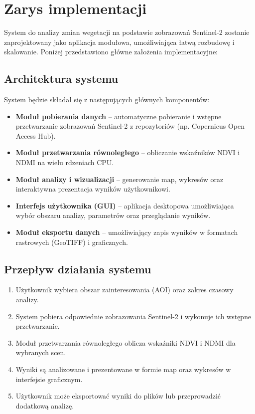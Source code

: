 \documentclass[12pt,a4paper]{article}
\begin{document}
\section{Zarys implementacji}
\label{sec:implementation}

System do analizy zmian wegetacji na podstawie zobrazowań Sentinel-2 zostanie zaprojektowany jako aplikacja modułowa, umożliwiająca łatwą rozbudowę i skalowanie. Poniżej przedstawiono główne założenia implementacyjne:

\subsection{Architektura systemu}
System będzie składał się z następujących głównych komponentów:
\begin{itemize}[leftmargin=*]
    \item \textbf{Moduł pobierania danych} -- automatyczne pobieranie i wstępne przetwarzanie zobrazowań Sentinel-2 z repozytoriów (np. Copernicus Open Access Hub).
    \item \textbf{Moduł przetwarzania równoległego} -- obliczanie wskaźników NDVI i NDMI na wielu rdzeniach CPU.
    \item \textbf{Moduł analizy i wizualizacji} -- generowanie map, wykresów oraz interaktywna prezentacja wyników użytkownikowi.
    \item \textbf{Interfejs użytkownika (GUI)} -- aplikacja desktopowa umożliwiająca wybór obszaru analizy, parametrów oraz przeglądanie wyników.
    \item \textbf{Moduł eksportu danych} -- umożliwiający zapis wyników w formatach rastrowych (GeoTIFF) i graficznych.
\end{itemize}

\subsection{Przepływ działania systemu}
\begin{enumerate}[leftmargin=*]
    \item Użytkownik wybiera obszar zainteresowania (AOI) oraz zakres czasowy analizy.
    \item System pobiera odpowiednie zobrazowania Sentinel-2 i wykonuje ich wstępne przetwarzanie.
    \item Moduł przetwarzania równoległego oblicza wskaźniki NDVI i NDMI dla wybranych scen.
    \item Wyniki są analizowane i prezentowane w formie map oraz wykresów w interfejsie graficznym.
    \item Użytkownik może eksportować wyniki do plików lub przeprowadzić dodatkową analizę.
\end{enumerate}
\end{document}

